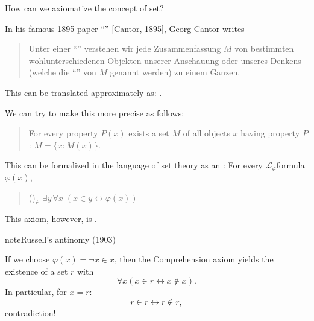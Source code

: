\documentclass[letterpaper,10pt,english]{jupyterBook}
\begin{document}
\sphinxAtStartPar
How can we axiomatize the concept of set?

\sphinxAtStartPar
In his famous 1895 paper “” {[}\hyperlink{cite.bibliography:id4}{Cantor, 1895}{]}, Georg Cantor writes
\begin{quote}

\sphinxAtStartPar
Unter einer “” verstehen wir jede Zusammenfassung \(M\) von bestimmten wohlunterschiedenen Objekten unserer Anschauung oder unseres Denkens (welche die “” von  \(M\)  genannt werden)  zu einem Ganzen.
\end{quote}

\sphinxAtStartPar
This can be translated approximately as: .

\sphinxAtStartPar
We can try to make this more precise as follows:
\begin{quote}

\sphinxAtStartPar
For every property \(P(x)\) exists a set \(M\) of all objects \(x\) having property \(P\):  \(M =\{x: M(x) \}\).
\end{quote}

\sphinxAtStartPar
This can be formalized in the language of set theory as an : For every \(\mathcal{L}_\in\)\sphinxhyphen{}formula \(\varphi(x)\),
\begin{quote}

\sphinxAtStartPar
()\(_\varphi\) \(\exists y \, \forall x \; ( x \in y \leftrightarrow \varphi(x))\)
\end{quote}

\sphinxAtStartPar
This axiom, however, is .

\begin{sphinxadmonition}{note}{Russell’s antinomy (1903)}

\sphinxAtStartPar
If we choose \(\varphi(x) = \neg x \in x\), then the Comprehension axiom yields the existence of a set \(r\) with
\begin{equation*}
\forall x ( x \in  r \leftrightarrow x \not \in x).
\end{equation*}
\sphinxAtStartPar
In particular, for \(x = r\):
\begin{equation*}
r \in  r \leftrightarrow r \not \in r ,
\end{equation*}
\sphinxAtStartPar
contradiction!
\end{sphinxadmonition}
\end{document}
